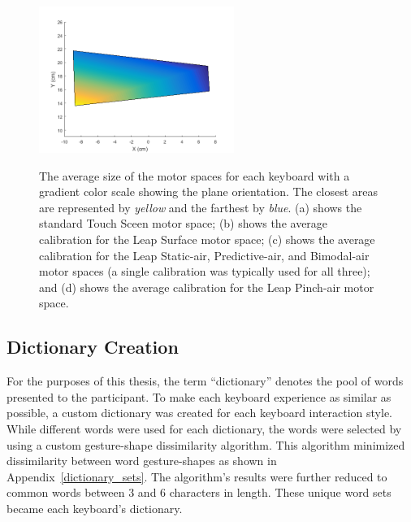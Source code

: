 \begin{figure}[!t]
\begin{minipage}[t]{2.5in}
		\label{fig_calibration_static}
	\end{minipage}
	\begin{minipage}[t]{2.5in}
		\includegraphics[width=2.5in]{Figures/fig_calibration_pinch}
		\label{fig_calibration_pinch}
	\end{minipage}
	\caption[Motor Space Comparison]{The average size of the motor spaces for each keyboard with a gradient color scale showing the plane orientation. The closest areas are represented by \textit{yellow} and the farthest by \textit{blue}. (a) shows the standard Touch Sceen motor space; (b) shows the average calibration for the Leap Surface motor space; (c) shows the average calibration for the Leap Static-air, Predictive-air, and Bimodal-air motor spaces (a single calibration was typically used for all three); and (d) shows the average calibration for the Leap Pinch-air motor space.}
	\label{motor_space_size}
\end{figure}

\subsection{Dictionary Creation} \label{dictionary_creation}
For the purposes of this thesis, the term ``dictionary'' denotes the pool of words presented to the participant. To make each keyboard experience as similar as possible, a custom dictionary was created for each keyboard interaction style. While different words were used for each dictionary, the words were selected by using a custom gesture-shape dissimilarity algorithm. This algorithm minimized dissimilarity between word gesture-shapes as shown in Appendix~\ref{dictionary_sets}. The algorithm's results were further reduced to common words between 3 and 6 characters in length. These unique word sets became each keyboard's dictionary.


